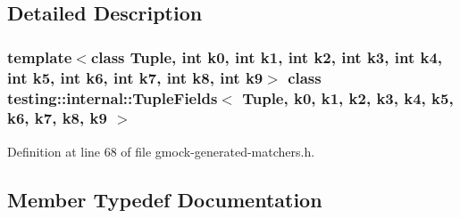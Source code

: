 \subsection{Detailed Description}
\subsubsection*{template$<$class Tuple, int k0, int k1, int k2, int k3, int k4, int k5, int k6, int k7, int k8, int k9$>$\newline
class testing\+::internal\+::\+Tuple\+Fields$<$ Tuple, k0, k1, k2, k3, k4, k5, k6, k7, k8, k9 $>$}



Definition at line 68 of file gmock-\/generated-\/matchers.\+h.



\subsection{Member Typedef Documentation}
\mbox{\label{classtesting_1_1internal_1_1TupleFields_a5480877377ebc94bf3a6c6cab5c369bc}} 
